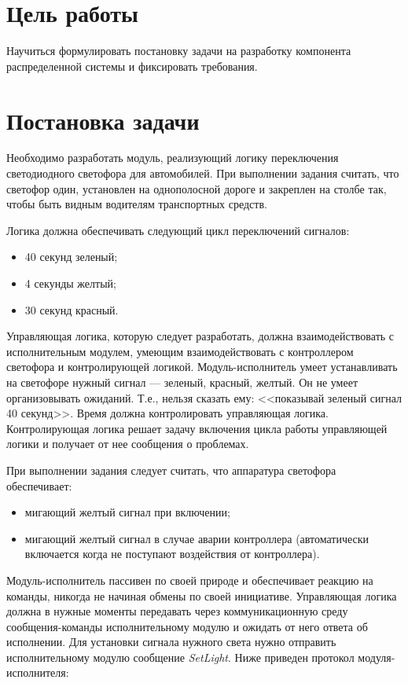 	\section{Цель работы}
		Научиться формулировать постановку задачи на разработку компонента распределенной системы и фиксировать требования.
	\section{Постановка задачи}
	
	Необходимо разработать модуль, реализующий логику переключения светодиодного светофора для автомобилей. При выполнении задания считать, что светофор один, установлен на однополосной дороге и закреплен на столбе так, чтобы быть видным водителям транспортных средств.
	
	
	Логика должна обеспечивать следующий цикл переключений сигналов:	
	\begin{itemize}
		\item 40 секунд зеленый;
		\item 4 секунды желтый;
		\item 30 секунд красный.
	\end{itemize}

	Управляющая логика, которую следует разработать, должна взаимодействовать с исполнительным модулем, умеющим взаимодействовать с контроллером светофора и контролирующей логикой. Модуль-исполнитель умеет устанавливать на светофоре нужный сигнал — зеленый, красный, желтый. Он не умеет организовывать ожиданий. Т.е., нельзя сказать ему: <<показывай зеленый сигнал 40 секунд>>. Время должна контролировать управляющая логика. Контролирующая логика решает задачу включения цикла работы управляющей логики и получает от нее сообщения о проблемах.
	
	При выполнении задания следует считать, что аппаратура светофора обеспечивает:
	\begin{itemize}
		\item мигающий желтый сигнал при включении;
		\item мигающий желтый сигнал в случае аварии контроллера (автоматически включается когда не поступают воздействия от контроллера).
	\end{itemize}

	Модуль-исполнитель пассивен по своей природе и обеспечивает реакцию на команды, никогда не начиная обмены по своей инициативе. Управляющая логика должна в нужные моменты передавать через коммуникационную среду сообщения-команды исполнительному модулю и ожидать от него ответа об исполнении. Для установки сигнала нужного света нужно отправить исполнительному модулю сообщение \textit{SetLight}. Ниже приведен протокол модуля-исполнителя:
	
